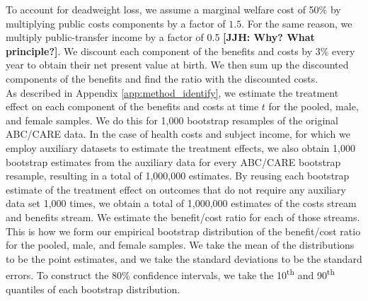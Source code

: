 \noindent To account for deadweight loss, we assume a marginal welfare cost of 50\% by multiplying
public costs components by a factor of $1.5$. For the same reason, we multiply public-transfer
income by a factor of 0.5 \textbf{[JJH: Why? What principle?]}. We discount each component of the benefits and costs
by 3\% every year to obtain their net present value at birth. We then sum up the discounted
components of the benefits and find the ratio with the discounted costs. \\

\noindent As described in Appendix \ref{app:method_identify}, we estimate the treatment effect on each
component of the benefits and costs at time $t$ for the pooled, male, and
female samples. We do this for 1,000 bootstrap resamples of the original ABC/CARE data.
In the case of health costs and subject income, for which we employ auxiliary datasets to
estimate the treatment effects, we also obtain 1,000 bootstrap estimates from the auxiliary data
for every ABC/CARE bootstrap resample, resulting in a total of 1,000,000 estimates.
By reusing each bootstrap estimate of the treatment effect on outcomes that do not require any auxiliary data
set 1,000 times, we obtain a total of 1,000,000 estimates of the costs stream and benefits stream.
We estimate the benefit/cost ratio for each of those streams.
This is how we form our empirical bootstrap distribution of the benefit/cost ratio for the pooled, male, and female samples.
We take the mean of the distributions to be the point estimates, and we take the standard deviations
to be the standard errors. To construct the 80\% confidence intervals, we take the 10\textsuperscript{th}
and 90\textsuperscript{th} quantiles of each bootstrap distribution.




